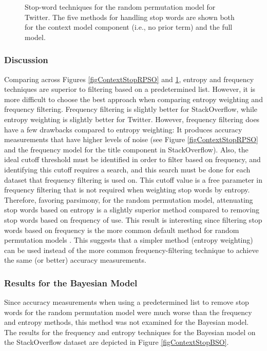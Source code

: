 \documentclass[man,floatsintext,donotrepeattitle]{apa6}
\begin{document}
\begin{figure}[!htbp]
  \caption{
  Stop-word techniques for the random permutation model for Twitter.
  The five methods for handling stop words are shown both for the context model component (i.e., no prior term) and the full model.
}
  \label{figContextStopRPT}
\end{figure}

\subsubsection{Discussion}

Comparing across Figures \ref{figContextStopRPSO} and \ref{figContextStopRPT}, entropy and frequency techniques are superior to filtering based on a predetermined list.
However, it is more difficult to choose the best approach when comparing entropy weighting and frequency filtering.
Frequency filtering is slightly better for StackOverflow, while entropy weighting is slightly better for Twitter.
However, frequency filtering does have a few drawbacks compared to entropy weighting:
It produces accuracy measurements that have higher levels of noise (see Figure \ref{figContextStopRPSO} and the frequency model for the title component in StackOverflow).
Also, the ideal cutoff threshold must be identified in order to filter based on frequency,
and identifying this cutoff requires a search, and this search must be done for each dataset that frequency filtering is used on.
This cutoff value is a free parameter in frequency filtering that is not required when weighting stop words by entropy.
Therefore, favoring parsimony, for the random permutation model, attenuating stop words based on entropy is a slightly superior method compared to removing stop words based on frequency of use.
This result is interesting since filtering stop words based on frequency is the more common default method for random permutation models \parencite{Sahlgren2008}.
This suggests that a simpler method (entropy weighting) can be used instead of the more common frequency-filtering technique to achieve the same (or better) accuracy measurements.

\subsubsection{Results for the Bayesian Model}

Since accuracy measurements when using a predetermined list to remove stop words for the random permutation model were much worse than the frequency and entropy methods, this method was not examined for the Bayesian model.
The results for the frequency and entropy techniques for the Bayesian model on the StackOverflow dataset are depicted in Figure \ref{figContextStopBSO}.
\end{document}
